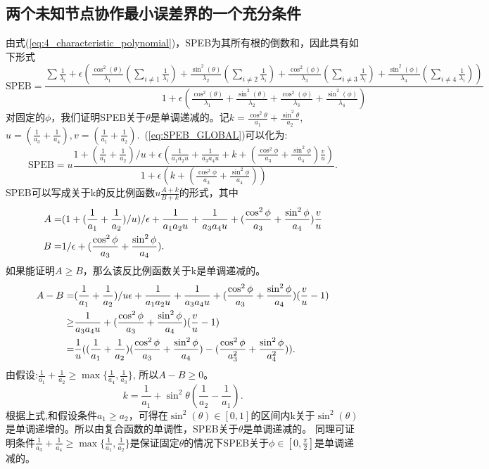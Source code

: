 \subsection{两个未知节点协作最小误差界的一个充分条件}\label{B_F_0}
由式(\ref{eq:4_characteristic_polynomial})，SPEB为其所有根的倒数和，因此具有如下形式
\begin{equation}\label{eq:SPEB_GLOBAL}
\text{SPEB}=\frac{\displaystyle\sum \frac{1}{\lambda_i}+\epsilon(\frac{\cos^2(\theta)}{\lambda_1}(\sum_{i \neq 1}\frac{1}{\lambda_i})+\frac{\sin^2(\theta)}{\lambda_2}(\displaystyle\sum_{i \neq 2}\frac{1}{\lambda_i})+\frac{\cos^2(\phi)}{\lambda_3}(\sum_{i \neq 3}\frac{1}{\lambda_i})+\frac{\sin^2(\phi)}{\lambda_4}(\sum_{i \neq 4}\frac{1}{\lambda_i}))}{\displaystyle 1+\epsilon(\frac{\cos^2(\theta)}{\lambda_1}+\frac{\sin^2(\theta)}{\lambda_2}+\frac{\cos^2(\phi)}{\lambda_3}+\frac{\sin^2(\phi)}{\lambda_4})}
\end{equation}
对固定的$\phi$，我们证明SPEB关于$\theta$是单调递减的。记$k=\frac{\cos^2 \theta}{a_1}+\frac{\sin^2 \theta}{a_2}$,$u=(\frac{1}{a_3}+\frac{1}{a_4}),v=(\frac{1}{a_1}+\frac{1}{a_2})$.~(\ref{eq:SPEB_GLOBAL})可以化为:
\begin{equation}
\text{SPEB}=u\frac{1+(\frac{1}{a_1}+\frac{1}{a_2})/u+\epsilon(\frac{1}{a_1a_2 u}+\frac{1}{a_3a_4 u}+k+(\frac{\cos^2\phi}{a_3}+\frac{\sin^2\phi}{a_4})\frac{v}{u})}{1+\epsilon(k+(\frac{\cos^2\phi}{a_3}+\frac{\sin^2\phi}{a_4}))}.
\end{equation}
SPEB可以写成关于k的反比例函数$u\frac{A+k}{B+k}$的形式，其中
\begin{align}\notag
A=&(1+(\frac{1}{a_1}+\frac{1}{a_2})/u)/\epsilon+\frac{1}{a_1a_2 u}+\frac{1}{a_3a_4 u}+(\frac{\cos^2\phi}{a_3}+\frac{\sin^2\phi}{a_4})\frac{v}{u}\\
B=&1/\epsilon+(\frac{\cos^2\phi}{a_3}+\frac{\sin^2\phi}{a_4}).
\end{align}
如果能证明$A \geq B$，那么该反比例函数关于k是单调递减的。
\begin{align}\notag
A-B=&(\frac{1}{a_1}+\frac{1}{a_2})/u\epsilon+\frac{1}{a_1a_2 u}+\frac{1}{a_3a_4 u}+(\frac{\cos^2\phi}{a_3}+\frac{\sin^2\phi}{a_4})(\frac{v}{u}-1)\\
\geq &\frac{1}{a_3a_4 u}+(\frac{\cos^2\phi}{a_3}+\frac{\sin^2\phi}{a_4})(\frac{v}{u}-1)\\
=&\frac{1}{u}((\frac{1}{a_1}+\frac{1}{a_2})(\frac{\cos^2\phi}{a_3}+\frac{\sin^2\phi}{a_4})-(\frac{\cos^2\phi}{a_3^2}+\frac{\sin^2\phi}{a_4^2})).\notag
\end{align}
由假设:$\frac{1}{a_1}+\frac{1}{a_2}\geq \max\{\frac{1}{a_4},\frac{1}{a_3}\}$,
所以$A-B\geq 0$。
\begin{equation}
k=\frac{1}{a_1}+\sin^2 \theta(\frac{1}{a_2}-\frac{1}{a_1}).
\end{equation}
根据上式,和假设条件$a_1\geq a_2$，可得在$\sin^2(\theta)\in[0,1]$的区间内k关于$\sin^2(\theta)$是单调递增的。所以由复合函数的单调性，SPEB关于$\theta$是单调递减的。
同理可证明条件$\frac{1}{a_3}+\frac{1}{a_4}\geq \max\{\frac{1}{a_1},\frac{1}{a_2}\}$是保证固定$\theta$的情况下SPEB关于$\phi \in [0,\frac{\pi}{2}]$是单调递减的。
